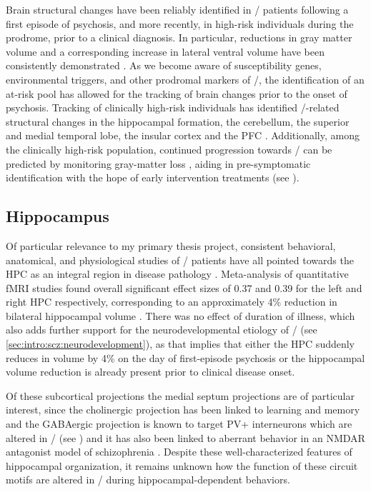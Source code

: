 Brain structural changes have been reliably identified in \scz/ patients following a first episode of psychosis, and more recently, in high-risk individuals during the prodrome, prior to a clinical diagnosis.
In particular, reductions in gray matter volume and a corresponding increase in lateral ventral volume have been consistently demonstrated \citep{Fusar-Poli2013, Shepherd2012}.
As we become aware of susceptibility genes, environmental triggers, and other prodromal markers of \scz/, the identification of an at-risk pool has allowed for the tracking of brain changes prior to the onset of psychosis.
Tracking of clinically high-risk individuals has identified \scz/-related structural changes in the hippocampal formation, the cerebellum, the superior and medial temporal lobe, the insular cortex and the \ac{PFC} \citep{Cannon2015, Millan2016}.
Additionally, among the clinically high-risk population, continued progression towards \scz/ can be predicted by monitoring gray-matter loss \citep{Tognin2014}, aiding in pre-symptomatic identification with the hope of early intervention treatments (see ).

\subsection{Hippocampus}\label{sec:intro:scz:hpc}
Of particular relevance to my primary thesis project, consistent behavioral, anatomical, and physiological studies of \scz/ patients have all pointed towards the HPC as an integral region in disease pathology \citep{Boyer2007, Bogerts1985, Jakob1986}.
Meta-analysis of quantitative \ac{fMRI} studies found overall significant effect sizes of 0.37 and 0.39 for the left and right \ac{HPC} respectively, corresponding to an approximately 4\% reduction in bilateral hippocampal volume \citep{Nelson1998}.
There was no effect of duration of illness, which also adds further support for the neurodevelopmental etiology of \scz/ (see \autoref{sec:intro:scz:neurodevelopment}), as that implies that either the \ac{HPC} suddenly reduces in volume by 4\% on the day of first-episode psychosis or the hippocampal volume reduction is already present prior to clinical disease onset. 

Of these subcortical projections the medial septum projections are of particular interest, since the cholinergic projection has been linked to learning and memory \citep{Parent2004} and the GABAergic projection is known to target PV+ interneurons \citep{Freund1988} which are altered in \scz/ (see ) and it has also been linked to aberrant behavior in an NMDAR antagonist model of schizophrenia \citep{Ma2012}.
Despite these well-characterized features of hippocampal organization, it remains unknown how the function of these circuit motifs are altered in \scz/ during hippocampal-dependent behaviors.

